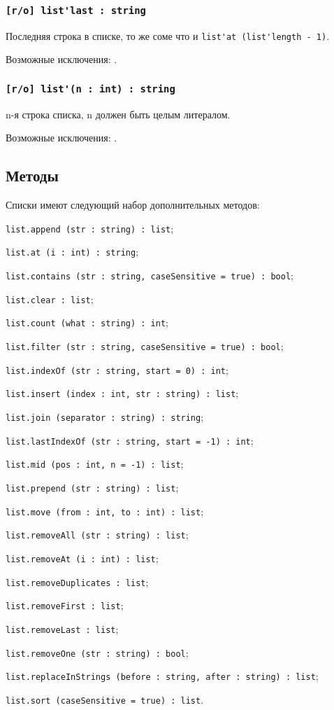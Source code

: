 \subsubsection{\lstinline|[r/o] list'last : string|}

Последняя строка в списке, то же соме что и \lstinline|list'at (list'length - 1)|.

Возможные исключения: .

\subsubsection{\lstinline|[r/o] list'(n : int) : string|}

n-я строка списка, n должен быть целым литералом.

Возможные исключения: .

\subsection{Методы}

Списки имеют следующий набор дополнительных методов:
\begin{icItems}
\item \lstinline|list.append (str : string) : list|;
\item \lstinline|list.at (i : int) : string|;
\item \lstinline|list.contains (str : string, caseSensitive = true) : bool|;
\item \lstinline|list.clear : list|;
\item \lstinline|list.count (what : string) : int|;
\item \lstinline|list.filter (str : string, caseSensitive = true) : bool|;
\item \lstinline|list.indexOf (str : string, start = 0) : int|;
\item \lstinline|list.insert (index : int, str : string) : list|;
\item \lstinline|list.join (separator : string) : string|;
\item \lstinline|list.lastIndexOf (str : string, start = -1) : int|;
\item \lstinline|list.mid (pos : int, n = -1) : list|;
\item \lstinline|list.prepend (str : string) : list|;
\item \lstinline|list.move (from : int, to : int) : list|;
\item \lstinline|list.removeAll (str : string) : list|;
\item \lstinline|list.removeAt (i : int) : list|;
\item \lstinline|list.removeDuplicates : list|;
\item \lstinline|list.removeFirst : list|;
\item \lstinline|list.removeLast : list|;
\item \lstinline|list.removeOne (str : string) : bool|;
\item \lstinline|list.replaceInStrings (before : string, after : string) : list|;
\item \lstinline|list.sort (caseSensitive = true) : list|.
\end{icItems}

